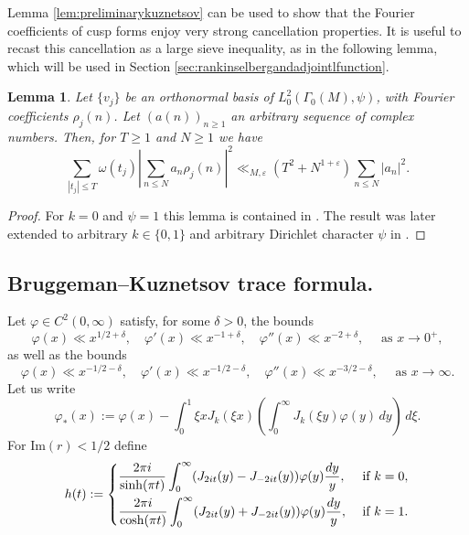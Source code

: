 \documentclass{article}
\newtheorem{lem}[thm]{Lemma}
\theoremstyle{named}
\begin{document}
Lemma \ref{lem:preliminarykuznetsov} can be used to show that the Fourier coefficients of cusp forms enjoy very strong cancellation properties. It is useful to recast this cancellation as a large sieve inequality, as in the following lemma, which will be used in Section \ref{sec:rankinselbergandadjointlfunction}.


\begin{lem}\label{lem:largesieveinequality}
Let $\{v_j\}$ be an orthonormal basis of $L_0^2(\Gamma_0(M), \psi)$, with Fourier coefficients $\rho_j(n)$. Let $(a(n))_{n \geq 1}$ an arbitrary sequence of complex numbers. Then, for $T \geq 1$ and $N \geq 1$ we have
\begin{equation*}
    \sum_{|t_j| \leq T} \omega(t_j)\left|\sum_{n \leq N}a_n \rho_j(n)\right|^2 \ll_{M, \varepsilon} (T^2 + N^{1 + \varepsilon}) \sum_{n \leq N} |a_n|^2.
\end{equation*}
\end{lem}
\begin{proof}
For $k = 0$ and $\psi = 1$ this lemma is contained in \cite[Theorem 2]{deshouillersiwaniec82}. The result was later extended to arbitrary $k \in \{0, 1\}$ and arbitrary Dirichlet character $\psi$ in \cite[Proposition 4.7]{sarydrappeau}.
\end{proof}
\subsection{Bruggeman--Kuznetsov trace formula.}\label{subsec:kuznetsovtraceformula}
Let $\varphi \in C^2(0, \infty)$ satisfy, for some $\delta > 0$, the bounds
\begin{equation}\label{eq:boundsnear0}
    \varphi(x) \ll x^{1/2 +\delta}, \quad \varphi'(x) \ll x^{-1 + \delta}, \quad \varphi''(x) \ll x^{-2 + \delta},\quad \text{ as }x \to 0^+,
\end{equation}
as well as the bounds
\begin{equation}\label{eq:boundsnearinfty}
    \varphi(x) \ll x^{-1/2 - \delta}, \quad \varphi'(x)\ll x^{-1/2 - \delta}, \quad \varphi''(x) \ll x^{-3/2 - \delta}, \quad \text{ as }x \to \infty.
\end{equation}
Let us write
\begin{equation*}
\varphi_*(x) := \varphi(x) - \int_0^1\xi x J_k(\xi x)\left(\int_0^\infty J_k(\xi y) \varphi(y)\, dy \right)\, d\xi.
\end{equation*}
For $\text{Im}(r) < 1/2$ define
\begin{equation}\label{eq:defihintermsofvarphi}
    h(t) := \begin{dcases}
        \frac{2 \pi i }{\sinh(\pi t)}\int_0^\infty (J_{2it}(y) - J_{-2it}(y))\varphi(y) \frac{dy}{y}, & \text{ if }k = 0,\\
        \frac{2 \pi i}{\cosh(\pi t)}\int_0^\infty (J_{2it}(y) + J_{-2it}(y)) \varphi(y)\frac{dy}{y}, & \text{ if }k = 1.
    \end{dcases}
\end{equation}
\end{document}
